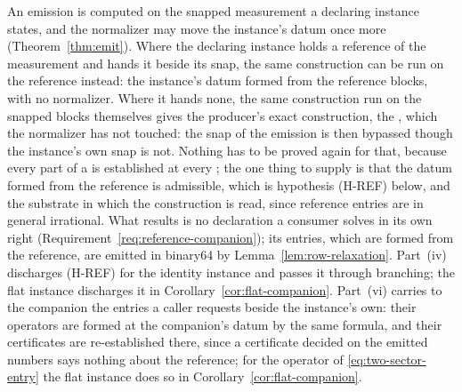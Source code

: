 
An emission is computed on the snapped measurement a declaring instance
states, and the normalizer may move the instance's datum once more
(Theorem~\ref{thm:emit}). Where the declaring instance holds a reference of
the measurement and hands it beside its snap, the same construction can be
run on the reference instead: the instance's datum formed from the reference
blocks, with no normalizer. Where it hands none, the same construction run on
the snapped blocks themselves gives the producer's exact construction, the
, which the normalizer has not touched: the snap of the
emission is then bypassed though the instance's own snap is not. Nothing has
to be proved again for that, because
every part of a  is established at every ;
the one thing to supply is that the datum formed from the reference is
admissible, which is hypothesis (H-REF) below, and the substrate in which the
construction is read, since reference entries are in general irrational.
What results is no declaration a consumer solves in its own right
(Requirement~\ref{req:reference-companion}); its entries, which are formed
from the reference, are emitted in binary64 by
Lemma~\ref{lem:row-relaxation}. Part~(iv) discharges (H-REF) for the identity
instance and passes it through branching; the flat instance discharges it in
Corollary~\ref{cor:flat-companion}. Part~(vi) carries to the companion the
entries a caller requests beside the instance's own: their operators are
formed at the companion's datum by the same formula, and their certificates
are re-established there, since a certificate decided on the emitted
numbers says nothing about the reference; for the operator of
\eqref{eq:two-sector-entry} the flat instance does so in
Corollary~\ref{cor:flat-companion}.

